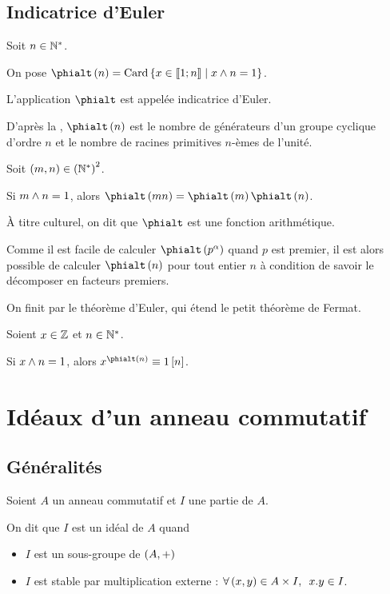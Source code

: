 \subsection{Indicatrice d'Euler}

\begin{defi}
Soit \(n\in\mathbb{N}^*\).

On pose \(\phialt\paren{n}=\Card\accol{x\in\interventierii{1}{n}\tq x\et n=1}\).

L'application \(\phialt\) est appelée indicatrice d'Euler.
\end{defi}

D'après la , \(\phialt\paren{n}\) est le nombre de générateurs d'un groupe cyclique d'ordre \(n\) et le nombre de racines primitives \(n\)-èmes de l'unité.

\begin{prop}
Soit \(\left(m,n\right)\in\left(\mathbb{N}^*\right)^2\).

Si \(m\land n=1\), alors \(\phialt\paren{mn}=\phialt\paren{m}\phialt\paren{n}\).
\end{prop}

À titre culturel, on dit que \(\phialt\) est une fonction arithmétique.

Comme il est facile de calculer \(\phialt\paren{p^\alpha}\) quand \(p\) est premier, il est alors possible de calculer \(\phialt\paren{n}\) pour tout entier \(n\) à condition de savoir le décomposer en facteurs premiers.

On finit par le théorème d'Euler, qui étend le petit théorème de Fermat.

\begin{prop}
Soient \(x\in\mathbb{Z}\) et \(n\in\mathbb{N}^*\).

Si \(x\land n=1\), alors \(x^{\phialt\paren{n}}\equiv1\croch{n}\).
\end{prop}

\section{Idéaux d'un anneau commutatif}

\subsection{Généralités}

\begin{defi}
Soient \(A\) un anneau commutatif et \(I\) une partie de \(A\).

On dit que \(I\) est un idéal de \(A\) quand

\begin{itemize}
    \item \(I\) est un sous-groupe de \(\groupe{A}[+]\) \\
    \item \(I\) est stable par multiplication externe : \(\quantifs{\forall\paren{x,y}\in A\times I}x.y\in I\).
\end{itemize}
\end{defi}

